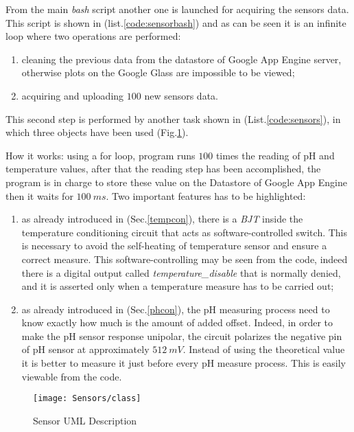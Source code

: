 From the main \textit{bash} script another one is launched for acquiring the sensors data. This script is shown in (list.\ref{code:sensorbash}) and as can be seen it is an infinite loop where two operations are performed:
\begin{enumerate}
	\item cleaning the previous data from the datastore of Google App Engine server, otherwise plots on the Google Glass are impossible to be viewed;
	\item acquiring and uploading $100$ new sensors data. 
\end{enumerate} 

This second step is performed by another task shown in (List.\ref{code:sensors}), in which three objects have been used (Fig.\ref{Fig:umlsensors}). 

How it works: using a for loop, program runs $100$ times the reading of pH and temperature values, after that the reading step has been accomplished, the program is in charge to store these value on the Datastore of Google App Engine then it waits for $100\ ms$. Two important features has to be highlighted:
\begin{enumerate}
	\item as already introduced in (Sec.\ref{tempcon}), there is a \textit{BJT} inside the temperature conditioning circuit that acts as software-controlled switch. This is necessary to avoid the self-heating of temperature sensor and ensure a correct measure. This software-controlling may be seen from the code, indeed there is a digital output called \textit{temperature\_disable} that is normally denied, and it is asserted only when a temperature measure has to be carried out;
	\item as already introduced in (Sec.\ref{phcon}), the pH measuring process need to know exactly how much is the amount of added offset. Indeed, in order to make the pH sensor response unipolar, the circuit polarizes the negative pin of pH sensor at approximately $512\ mV$. Instead of using the theoretical value it is better to measure it just before every pH measure process. This is easily viewable from the code. 
\end{enumerate}   

\begin{figure}[h]
	\centering
	\texttt{[image: Sensors/class]}
	\caption{Sensor UML Description}
	\label{Fig:umlsensors}
	
\end{figure}

